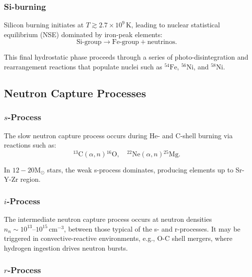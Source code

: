 \subsubsection{Si-burning}

Silicon burning initiates at \( T \gtrsim 2.7\times10^9\,\mathrm{K} \), leading to nuclear statistical equilibrium (NSE) dominated by iron-peak elements:
\begin{equation}
\text{Si-group} \rightarrow \text{Fe-group} + \text{neutrinos}.
\end{equation}

This final hydrostatic phase proceeds through a series of photo-disintegration and rearrangement reactions that populate nuclei such as $^{54}\mathrm{Fe}$, $^{56}\mathrm{Ni}$, and $^{58}\mathrm{Ni}$.

\subsection{Neutron Capture Processes}

\subsubsection{\texorpdfstring{$s$-Process}{s-Process}}

The slow neutron capture process occurs during He- and C-shell burning via reactions such as:
\begin{equation}
{}^{13}\mathrm{C}(\alpha,n){}^{16}\mathrm{O}, \quad {}^{22}\mathrm{Ne}(\alpha,n){}^{25}\mathrm{Mg}.
\end{equation}

In $12-20 \mathrm{M}_\odot$ stars, the weak s-process dominates, producing elements up to Sr-Y-Zr region.

\subsubsection{\texorpdfstring{$i$-Process}{i-Process}}

The intermediate neutron capture process occurs at neutron densities $n_n \sim 10^{13}\text{–}10^{15}\,\mathrm{cm}^{-3}$, between those typical of the s- and r-processes. It may be triggered in convective-reactive environments, e.g., O-C shell mergers, where hydrogen ingestion drives neutron bursts.

\subsubsection{\texorpdfstring{$r$-Process}{r-Process}}

